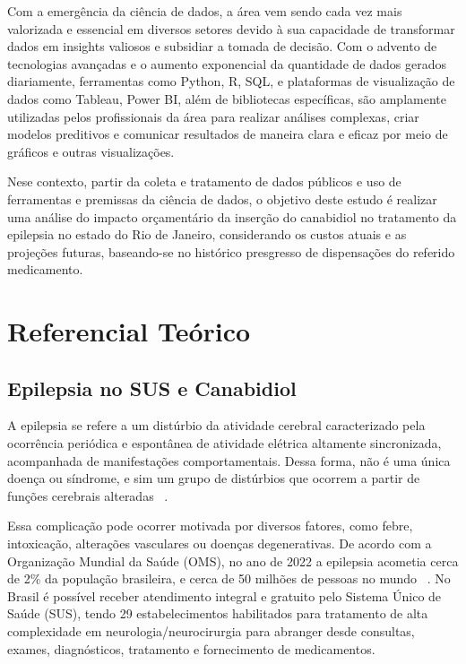 \documentclass[article,a4paper,12pt,brazil,sumario=tradicional]{abntex2}
\begin{document}
Com a emergência da ciência de dados, a área vem sendo cada vez mais valorizada e essencial em diversos setores devido à sua capacidade de transformar dados em insights valiosos e subsidiar a tomada de decisão. Com o advento de tecnologias avançadas e o aumento exponencial da quantidade de dados gerados diariamente, ferramentas como Python, R, SQL, e plataformas de visualização de dados como Tableau, Power BI, além de bibliotecas específicas, são amplamente utilizadas pelos profissionais da área para realizar análises complexas, criar modelos preditivos e comunicar resultados de maneira clara e eficaz por meio de gráficos e outras visualizações.

Nese contexto, partir da coleta e tratamento de dados públicos e uso de ferramentas e premissas da ciência de dados, o objetivo deste estudo é realizar uma análise do impacto orçamentário da inserção do canabidiol no tratamento da epilepsia no estado do Rio de Janeiro, considerando os custos atuais e as projeções futuras, baseando-se no histórico presgresso de dispensações do referido medicamento.

\section{Referencial Teórico}

\subsection{Epilepsia no SUS e Canabidiol}

A epilepsia se refere a um distúrbio da atividade cerebral caracterizado pela ocorrência periódica e espontânea de atividade elétrica altamente sincronizada, acompanhada de manifestações comportamentais. Dessa forma, não é uma única doença ou síndrome, e sim um grupo de distúrbios que ocorrem a partir de funções cerebrais alteradas ~\cite{scorza_albuquerque_arida_cavalheiro_2007}.

Essa complicação pode ocorrer motivada por diversos fatores, como febre, intoxicação, alterações vasculares ou doenças degenerativas. De acordo com a Organização Mundial da Saúde (OMS), no ano de 2022 a epilepsia acometia cerca de 2\% da população brasileira, e cerca de 50 milhões de pessoas no mundo ~\cite{epilepsia2022OMS}. No Brasil é possível receber atendimento integral e gratuito pelo Sistema Único de Saúde (SUS), tendo 29 estabelecimentos habilitados para tratamento de alta complexidade em neurologia/neurocirurgia para abranger desde consultas, exames, diagnósticos, tratamento e fornecimento de medicamentos.
\end{document}
